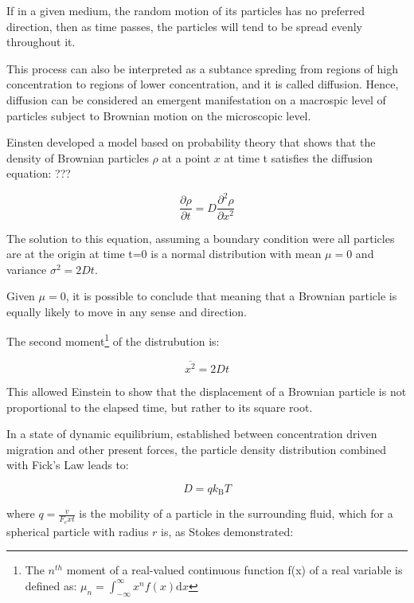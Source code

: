 If in a given medium, the random motion of its particles has no preferred direction, then as time passes, the particles will tend to be spread evenly throughout it.

This process can also be interpreted as a subtance spreding from regions of high concentration to regions of lower concentration, and it is called diffusion. Hence, diffusion can be considered an emergent manifestation on a macrospic level of particles subject to Brownian motion on the microscopic level.

Einsten developed a model based on probability theory that shows that the density of Brownian particles $\rho$ at a point $x$ at time t satisfies the diffusion equation: ???

\begin{equation}
\frac{\partial \rho}{\partial t}=D \frac{\partial^{2} \rho}{\partial x^{2}}
\end{equation}

The solution to this equation, assuming a boundary condition were all particles are at the origin at time t=0 is a normal distribution with mean $\mu=0$ and variance $\sigma^{2}=2 D t$.

Given $\mu=0$, it is possible to conclude that  meaning that a Brownian particle is equally likely to move in any sense and direction.

The second moment\footnote{The $n^{th}$ moment of a real-valued continuous function f(x) of a real variable is defined as:  $\mu_{n}=\int_{-\infty}^{\infty} x^{n} f(x) \mathrm{d} x$} of the distrubution is:

\begin{equation}
\overline{x^{2}}=2 D t
\end{equation}

This allowed Einstein to show that the displacement of a Brownian particle is not proportional to the elapsed time, but rather to its square root.

In a state of dynamic equilibrium, established between concentration driven migration and other present forces, the particle density distribution combined with Fick's Law leads to:

\begin{equation}
D=q k_{\mathrm{B}} T
\end{equation}

where $q = \frac{v}{F_ext}$ is the mobility of a particle in the surrounding fluid, which for a spherical particle with radius $r$ is, as Stokes demonstrated: 

